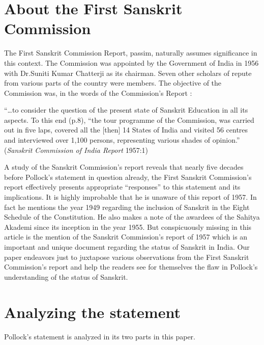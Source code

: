 \section{About the First Sanskrit Commission}

The First Sanskrit Commission Report, passim, naturally assumes significance in this context. The Commission was appointed by the Government of India in 1956 with Dr.Suniti Kumar Chatterji as its chairman. Seven other scholars of repute from various parts of the country were members. The objective of the Commission was, in the words of the Commission’s Report :
\smallskip

\begin{myquote}
\eleven
“…to consider the question of the present state of Sanskrit Education in all its aspects. To this end (p.8), “the tour programme of the Commission, was carried out in five laps, covered all the [then] 14 States of India and  visited 56 centres and interviewed over 1,100 persons, representing various shades of opinion.” \hfill({\sl Sanskrit Commission of India Report} 1957:1)
\end{myquote}
\smallskip

A study of the Sanskrit Commission’s report reveals that nearly five decades before Pollock’s statement in question already, the First Sanskrit Commission’s report effectively presents appropriate “responses” to this statement and its implications. It is highly improbable that he is unaware of this report of 1957. In fact he mentions the year 1949 regarding the inclusion of Sanskrit in the Eight Schedule of the Constitution. He also makes a note of the awardees of the Sahitya Akademi since its inception in the year 1955. But conspicuously missing in this article is the mention of the Sanskrit Commission’s report of 1957 which is an important and unique document regarding the status of Sanskrit in India.  Our paper endeavors just to juxtapose various observations from the First Sanskrit Commission’s report and help the readers see for themselves the flaw in Pollock’s understanding of the status of Sanskrit.

\section{Analyzing the statement}

Pollock’s statement is analyzed in its two parts in this paper. 

